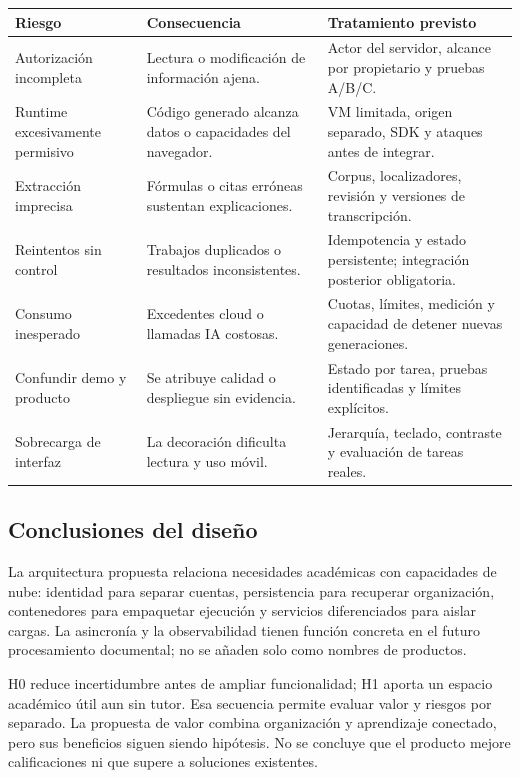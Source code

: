 \small
\begin{tabularx}{\linewidth}{P{2.8cm}Y Y}
\toprule
\textbf{Riesgo} & \textbf{Consecuencia} & \textbf{Tratamiento previsto}\\
\midrule
Autorización incompleta & Lectura o modificación de información ajena. & Actor del servidor, alcance por propietario y pruebas A/B/C.\\
Runtime excesivamente permisivo & Código generado alcanza datos o capacidades del navegador. & VM limitada, origen separado, SDK y ataques antes de integrar.\\
Extracción imprecisa & Fórmulas o citas erróneas sustentan explicaciones. & Corpus, localizadores, revisión y versiones de transcripción.\\
Reintentos sin control & Trabajos duplicados o resultados inconsistentes. & Idempotencia y estado persistente; integración posterior obligatoria.\\
Consumo inesperado & Excedentes cloud o llamadas IA costosas. & Cuotas, límites, medición y capacidad de detener nuevas generaciones.\\
Confundir demo y producto & Se atribuye calidad o despliegue sin evidencia. & Estado por tarea, pruebas identificadas y límites explícitos.\\
Sobrecarga de interfaz & La decoración dificulta lectura y uso móvil. & Jerarquía, teclado, contraste y evaluación de tareas reales.\\
\bottomrule
\end{tabularx}
\normalsize
\subsection{Conclusiones del diseño}
La arquitectura propuesta relaciona necesidades académicas con capacidades de nube: identidad para separar cuentas, persistencia para recuperar organización, contenedores para empaquetar ejecución y servicios diferenciados para aislar cargas. La asincronía y la observabilidad tienen función concreta en el futuro procesamiento documental; no se añaden solo como nombres de productos.

H0 reduce incertidumbre antes de ampliar funcionalidad; H1 aporta un espacio académico útil aun sin tutor. Esa secuencia permite evaluar valor y riesgos por separado. La propuesta de valor combina organización y aprendizaje conectado, pero sus beneficios siguen siendo hipótesis. No se concluye que el producto mejore calificaciones ni que supere a soluciones existentes.

